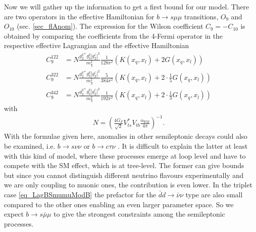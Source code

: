 \noindent Now we will gather up the information to get a first bound for our model. There are two operators in the effective Hamiltonian for $b\rightarrow s\mu\mu$
transitions, $O_9$ and $O_{10}$ (sec. \ref{sec_flAnom}). The expression for the Wilson coefficient $C_9 = -C_{10}$ \cite{1408.1627} is obtained by comparing the 
coefficients from the 4-Fermi operator in the respective effective Lagrangian and the effective Hamiltonian
\begin{align}
 C_9^{122} &= N \frac{g_2^{q*}g_3^q|g_2^l|^2}{m_\chi^2} \frac{1}{128\pi^2} \left(K(x_q,x_l) + 2G(x_q,x_l)\right)\label{eq_WilsonBsmumu122}\\
 C_9^{{322}} &= N \frac{g_2^{q*}g_3^q|g_2^l|^2}{m_\chi^2} \frac{5}{384\pi^2} \left(K(x_q,x_l) + 2\cdot\frac15 G(x_q,x_l)\right)\\
 C_9^{{342}} &= N \frac{g_2^{q*}g_3^q|g_2^l|^2}{m_\chi^2} \frac{1}{192\pi^2} \left(K(x_q,x_l) + 2\cdot\frac13 G(x_q,x_l)\right)
 \label{eq_WilsonBsmumu342}
\end{align}
with
\begin{align}
 N = \left(\frac{4G_F}{\sqrt{2}} V_{ts}^*V_{tb} \frac{\alpha_\text{EM}}{4\pi}\right)^{-1}.
\end{align}
With the formulae given here, anomalies in other semileptonic decays could also be examined, i.e. $b \rightarrow s\nu\nu$ \cite{1409.4557} or 
$b \rightarrow c\tau\nu$ \cite{1507.03233}. 
It is difficult to explain the latter at least with this kind of model, where these processes emerge at loop level and have to compete with the 
SM effect, which is at tree-level. The former can give bounds but since you cannot distinguish different neutrino flavours experimentally
and we are only coupling to muonic ones, the contribution is even lower. In the triplet case \eqref{eq_LagBSmumuModB} the prefactor
for the $\bar dd\rightarrow \bar\nu\nu$ type
are also small compared to the other ones enabling an even larger parameter space. So we expect $b\rightarrow s\bar \mu \mu$ 
to give the strongest constraints among the semileptonic processes.






